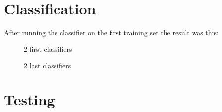 \documentclass{article}
\begin{document}
\section{Classification}
After running the classifier on the first training set the result was this:
\begin{figure}[h!]%
		\centering
    	\caption{2 first classifiers }%
	
    	\label{fig:p12}%
	\end{figure}
\begin{figure}[h!]%
		\centering
    	\caption{2 last classifiers }%

    	\label{fig:p34}%
	\end{figure}


\newpage
\section{Testing}
	
\end{document}
